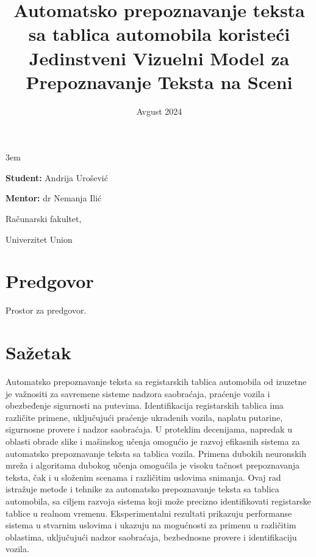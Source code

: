 \documentclass[a4paper,12pt]{article}
\title{Automatsko prepoznavanje teksta sa tablica \todo{vozila, ne nuzno automobila}automobila koristeći Jedinstveni Vizuelni Model za Prepoznavanje Teksta na Sceni}
\date{}
\begin{document}
	\emergencystretch 3em
	\begin{titlepage}
		\centering
		{\huge\bfseries \maketitle}
		
		{\large
			\textbf{Student:}
			Andrija Urošević
			\par
			\bigskip
			\textbf{Mentor:}
			dr Nemanja Ilić
		}
	
		\vfill
		{\large Računarski fakultet,\par}
		{\large Univerzitet Union\par}
		\bigskip
		\date{Avgust 2024}
	\end{titlepage}
	
	
	\section*{Predgovor}
	Prostor za predgovor.
	\newpage
	
	\tableofcontents
	\newpage
	
	
	\section*{Sažetak}
	\noindent
	Automatsko prepoznavanje teksta sa registarskih tablica automobila od izuzetne je važnositi za savremene sisteme nadzora saobraćaja, praćenje vozila i obezbeđenje sigurnosti na putevima. Identifikacija registarskih tablica ima različite primene, uključujući praćenje ukradenih vozila, naplatu putarine, sigurnosne provere i nadzor saobraćaja. U proteklim decenijama, napredak u oblasti obrade slike i mašinskog učenja omogućio je razvoj efikasnih sistema za automatsko prepoznavanje teksta sa tablica vozila. Primena dubokih neuronskih mreža i algoritama dubokog učenja omogućila je visoku tačnost prepoznavanja teksta, čak i u složenim scenama i različitim uslovima snimanja. Ovaj rad istražuje metode i tehnike za automatsko prepoznavanje teksta sa tablica automobila, sa ciljem razvoja sistema koji može precizno identifikovati registarske tablice u realnom vremenu. Eksperimentalni rezultati prikazuju performanse sistema u stvarnim uslovima i ukazuju na mogućnosti za primenu u različitim oblastima, uključujući nadzor saobraćaja, bezbednosne provere i identifikaciju vozila.
	\newpage
	
\end{document}

